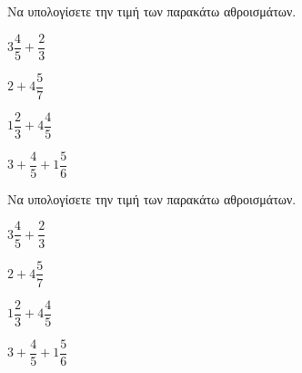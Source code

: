 Να υπολογίσετε την τιμή των παρακάτω αθροισμάτων.
\begin{multicols}{2}
\begin{rlist}
\item $ 3\dfrac{4}{5}+\dfrac{2}{3} $
\item $ 2+4\dfrac{5}{7} $
\item $ 1\dfrac{2}{3}+4\dfrac{4}{5} $
\item $ 3+\dfrac{4}{5}+1\dfrac{5}{6} $
\end{rlist}
\end{multicols}
Να υπολογίσετε την τιμή των παρακάτω αθροισμάτων.
\begin{multicols}{2}
\begin{rlist}
\item $ 3\dfrac{4}{5}+\dfrac{2}{3} $
\item $ 2+4\dfrac{5}{7} $
\item $ 1\dfrac{2}{3}+4\dfrac{4}{5} $
\item $ 3+\dfrac{4}{5}+1\dfrac{5}{6} $
\end{rlist}
\end{multicols}
